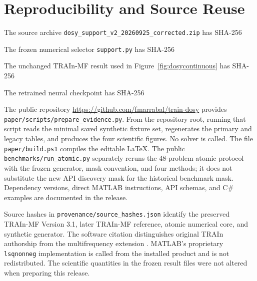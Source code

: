 \section{Reproducibility and Source Reuse}\label{app:repro}
The source archive \texttt{dosy\_support\_v2\_20260925\_corrected.zip} has SHA-256
\begin{quote}\small\ttfamily{}\end{quote}
The frozen numerical selector \texttt{support.py} has SHA-256
\begin{quote}\small\ttfamily{}\end{quote}
The unchanged TRAIn-MF result used in Figure~\ref{fig:dosycontinuous} has SHA-256
\begin{quote}\small\ttfamily{}\end{quote}
The retrained neural checkpoint has SHA-256
\begin{quote}\small\ttfamily{}\end{quote}

The public repository \url{https://github.com/fmarrabal/train-dosy} provides \texttt{paper/scripts/prepare\_evidence.py}. From the repository root, running that script reads the minimal saved synthetic fixture set, regenerates the primary and legacy tables, and produces the four scientific figures. No solver is called. The file \texttt{paper/build.ps1} compiles the editable LaTeX. The public \texttt{benchmarks/run\_atomic.py} separately reruns the 48-problem atomic protocol with the frozen generator, mask convention, and four methods; it does not substitute the new API discovery mask for the historical benchmark mask. Dependency versions, direct MATLAB instructions, API schemas, and C\# examples are documented in the release.

Source hashes in \texttt{provenance/source\_hashes.json} identify the preserved TRAIn-MF Version 3.1, later TRAIn-MF reference, atomic numerical core, and synthetic generator. The software citation distinguishes original TRAIn authorship from the multifrequency extension \cite{train,mfv31,software}. MATLAB's proprietary \texttt{lsqnonneg} implementation is called from the installed product and is not redistributed. The scientific quantities in the frozen result files were not altered when preparing this release.

